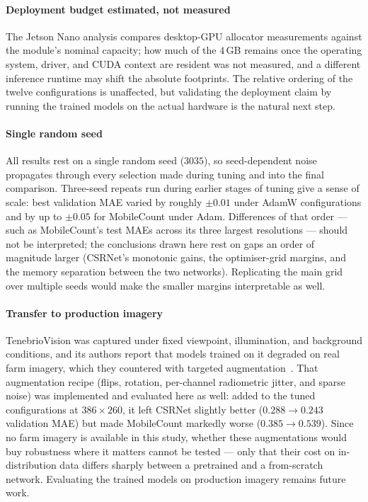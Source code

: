 \documentclass[conference]{IEEEtran}
\begin{document}
\paragraph{Deployment budget estimated, not measured}
The Jetson Nano analysis compares desktop-GPU allocator measurements against
the module's nominal capacity; how much of the $4$\,GB remains once the
operating system, driver, and CUDA context are resident was not measured, and
a different inference runtime may shift the absolute footprints. The relative
ordering of the twelve configurations is unaffected, but validating the
deployment claim by running the trained models on the actual hardware is the
natural next step.

\paragraph{Single random seed}
All results rest on a single random seed ($3035$), so seed-dependent noise
propagates through every selection made during tuning and into the final
comparison. Three-seed repeats run during earlier stages of tuning give a
sense of scale: best validation MAE varied by roughly $\pm0.01$ under AdamW
configurations and by up to $\pm0.05$ for MobileCount under Adam. Differences
of that order — such as MobileCount's test MAEs across its three largest
resolutions — should not be interpreted; the conclusions drawn here rest on
gaps an order of magnitude larger (CSRNet's monotonic gains, the
optimiser-grid margins, and the memory separation between the two networks).
Replicating the main grid over multiple seeds would make the smaller margins
interpretable as well.

\paragraph{Transfer to production imagery}
TenebrioVision was captured under fixed viewpoint, illumination, and
background conditions, and its authors report that models trained on it
degraded on real farm imagery, which they countered with targeted
augmentation~\cite{Papadopoulos2024TenebrioVision}. That augmentation recipe
(flips, rotation, per-channel radiometric jitter, and sparse noise) was
implemented and evaluated here as well: added to the tuned configurations at
$386\times260$, it left CSRNet slightly better ($0.288 \rightarrow 0.243$
validation MAE) but made MobileCount markedly worse
($0.385 \rightarrow 0.539$). Since no farm imagery is available in this study,
whether these augmentations would buy robustness where it matters cannot be
tested — only that their cost on in-distribution data differs sharply between
a pretrained and a from-scratch network. Evaluating the trained models on
production imagery remains future work.
\end{document}
